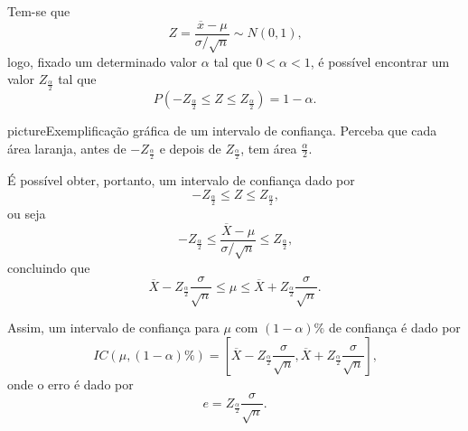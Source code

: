\documentclass[11pt,fleqn]{book}
\numberwithin{mpicture}{chapter}
\numberwithin{mtable}{chapter}
\numberwithin{mframe}{chapter}
\begin{document}
Tem-se que
\[
	Z=\frac{\overline{x}-\mu}{\sigma/\sqrt{n}}\sim N(0,1)\text{,}
\]
logo, fixado um determinado valor $\alpha$ tal que $0<\alpha<1$, é possível encontrar um valor $Z_{\frac{\alpha}{2}}$ tal que
\[
	P(-Z_{\frac{\alpha}{2}} \leqslant Z\leqslant Z_{\frac{\alpha}{2}})=1-\alpha
	\text{.}
\]

\begin{sidepicture}{4cm}{picture}{Exemplificação gráfica de um intervalo de confiança. Perceba que cada área laranja, antes de $-Z_{\frac{\alpha}{2}}$ e depois de $Z_{\frac{\alpha}{2}}$, tem área $\frac{\alpha}{2}$.}
	\label{fig:cap0:intervalo_confianca_01}
\end{sidepicture}

É possível obter, portanto, um intervalo de confiança dado por
\[
	-Z_{\frac{\alpha}{2}} \leqslant Z\leqslant Z_{\frac{\alpha}{2}}
	\text{,}
\]
ou seja
\[
	-Z_{\frac{\alpha}{2}} \leqslant 
		\frac{\overline{X}-\mu}{\sigma/\sqrt{n}}
	\leqslant Z_{\frac{\alpha}{2}}
	\text{,}
\]
concluindo que
\[
	\overline{X}-Z_{\frac{\alpha}{2}}\frac{\sigma}{\sqrt{n}}
	\leqslant
	\mu
	\leqslant
	\overline{X}+Z_{\frac{\alpha}{2}}\frac{\sigma}{\sqrt{n}}
	\text{.}
\]

Assim, um intervalo de confiança para $\mu$ com $(1-\alpha)\%$ de confiança é dado por
\[
	IC(\mu, (1-\alpha)\%) = \left [
		\overline{X} - Z_{\frac{\alpha}{2}}\frac{\sigma}{\sqrt{n}}
		,
		\overline{X} + Z_{\frac{\alpha}{2}}\frac{\sigma}{\sqrt{n}}
	\right ]
	\text{,}
\]
onde o erro é dado por
\[
	e=Z_{\frac{\alpha}{2}}\frac{\sigma}{\sqrt{n}}
	\text{.}
\]
\end{document}
